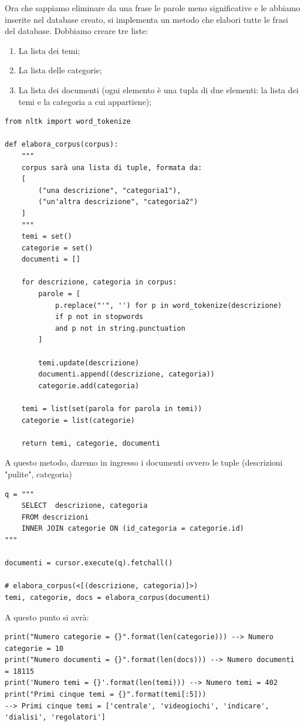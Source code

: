 \documentclass[10pt,a4paper]{report}
\begin{document}
Ora che sappiamo eliminare da una frase le parole meno significative e le abbiamo inserite nel database creato, si implementa un metodo che elabori tutte le frasi del database. Dobbiamo creare tre liste:
\begin{enumerate}
\item La lista dei temi;
\item La lista delle categorie;
\item La lista dei documenti (ogni elemento è una tupla di due elementi: la lista dei temi e la categoria a cui appartiene);
\end{enumerate}

\begin{verbatim}
from nltk import word_tokenize

def elabora_corpus(corpus):
    """
    corpus sarà una lista di tuple, formata da:
    [
        ("una descrizione", "categoria1"),
        ("un'altra descrizione", "categoria2")
    ]
    """
    temi = set()
    categorie = set()
    documenti = []
    
    for descrizione, categoria in corpus:
   		parole = [
           	p.replace("'", '') for p in word_tokenize(descrizione)
          	if p not in stopwords
          	and p not in string.punctuation
        ]
        
        temi.update(descrizione)
        documenti.append((descrizione, categoria))
        categorie.add(categoria)
    
    temi = list(set(parola for parola in temi))
    categorie = list(categorie)

    return temi, categorie, documenti
\end{verbatim}
A questo metodo, daremo in ingresso i documenti ovvero le tuple (descrizioni "pulite", categoria) 
\begin{verbatim}
q = """
    SELECT  descrizione, categoria
    FROM descrizioni
    INNER JOIN categorie ON (id_categoria = categorie.id)
"""

documenti = cursor.execute(q).fetchall()

# elabora_corpus(<[(descrizione, categoria)]>)
temi, categorie, docs = elabora_corpus(documenti)
\end{verbatim}
A questo punto si avrà:
\begin{verbatim}
print("Numero categorie = {}".format(len(categorie))) --> Numero categorie = 10
print("Numero documenti = {}".format(len(docs))) --> Numero documenti = 18115
print('Numero temi = {}'.format(len(temi))) --> Numero temi = 402
print("Primi cinque temi = {}".format(temi[:5])) 
--> Primi cinque temi = ['centrale', 'videogiochi', 'indicare', 'dialisi', 'regolatori']
\end{verbatim}
\end{document}
